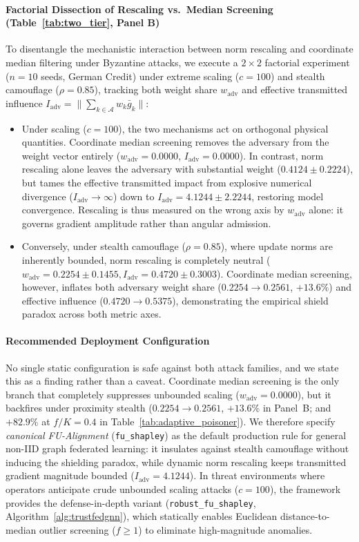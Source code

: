 \paragraph{Factorial Dissection of Rescaling vs.\ Median Screening (Table~\ref{tab:two_tier}, Panel B)}
To disentangle the mechanistic interaction between norm rescaling and coordinate median filtering under Byzantine attacks, we execute a $2 \times 2$ factorial experiment ($n=10$ seeds, German Credit) under extreme scaling ($c=100$) and stealth camouflage ($\rho=0.85$), tracking both weight share $w_{\mathrm{adv}}$ and effective transmitted influence $I_{\mathrm{adv}} = \lVert\sum_{k\in\mathcal{A}} w_k \bar g_k\rVert$:
\begin{itemize}[leftmargin=*]
    \item Under scaling ($c=100$), the two mechanisms act on orthogonal physical quantities. Coordinate median screening removes the adversary from the weight vector entirely ($w_{\mathrm{adv}} = 0.0000$, $I_{\mathrm{adv}} = 0.0000$). In contrast, norm rescaling alone leaves the adversary with substantial weight ($0.4124 \pm 0.2224$), but tames the effective transmitted impact from explosive numerical divergence ($I_{\mathrm{adv}} \to \infty$) down to $I_{\mathrm{adv}} = 4.1244 \pm 2.2244$, restoring model convergence. Rescaling is thus measured on the wrong axis by $w_{\mathrm{adv}}$ alone: it governs gradient amplitude rather than angular admission.
    \item Conversely, under stealth camouflage ($\rho=0.85$), where update norms are inherently bounded, norm rescaling is completely neutral ($w_{\mathrm{adv}} = 0.2254 \pm 0.1455, I_{\mathrm{adv}} = 0.4720 \pm 0.3003$). Coordinate median screening, however, inflates both adversary weight share ($0.2254 \to 0.2561$, $+13.6\%$) and effective influence ($0.4720 \to 0.5375$), demonstrating the empirical shield paradox across both metric axes.
\end{itemize}

\paragraph{Recommended Deployment Configuration}
No single static configuration is safe against both attack families, and we state this as a finding rather than a caveat. Coordinate median screening is the only branch that completely suppresses unbounded scaling ($w_{\mathrm{adv}} = 0.0000$), but it backfires under proximity stealth ($0.2254 \to 0.2561$, $+13.6\%$ in Panel~B; and $+82.9\%$ at $f/K = 0.4$ in Table~\ref{tab:adaptive_poisoner}). We therefore specify \emph{canonical FU-Alignment} (\texttt{fu\_shapley}) as the default production rule for general non-IID graph federated learning: it insulates against stealth camouflage without inducing the shielding paradox, while dynamic norm rescaling keeps transmitted gradient magnitude bounded ($I_{\mathrm{adv}} = 4.1244$). In threat environments where operators anticipate crude unbounded scaling attacks ($c = 100$), the framework provides the defense-in-depth variant (\texttt{robust\_fu\_shapley}, Algorithm~\ref{alg:trustfedgnn}), which statically enables Euclidean distance-to-median outlier screening ($f \ge 1$) to eliminate high-magnitude anomalies.

